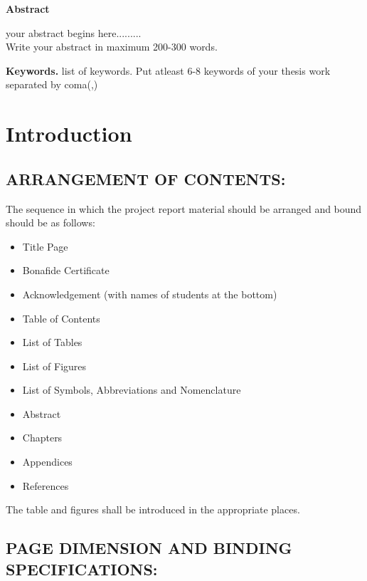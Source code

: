 \documentclass[12pt]{report}
\begin{document}
\newpage
\vspace*{1cm}
\begin{center}
\LARGE
\textbf{Abstract}
\end{center}

\justify
 your abstract begins here.........\\
 Write your abstract in maximum 200-300 words.
 
 \vspace*{1cm}
 \smallskip
\noindent \textbf{Keywords.} list of keywords.
 Put atleast 6-8 keywords of your thesis work separated by coma(,)
 

\newpage
\tableofcontents



\listoffigures


\newpage

\listoftables

\newpage
\chapter{Introduction}
\section{ARRANGEMENT OF CONTENTS:}

The sequence in which the project report material should be arranged and bound should be as follows:


\begin{itemize}
	\item Title Page
\item Bonafide Certificate
\item Acknowledgement (with names of students at the bottom)
\item Table of Contents
\item List of Tables
\item List of Figures
\item List of Symbols, Abbreviations and Nomenclature
\item Abstract
\item Chapters
\item Appendices
\item References
\end{itemize}

The table and figures shall be introduced in the appropriate places.
\section{PAGE DIMENSION AND BINDING SPECIFICATIONS:}
\end{document}
